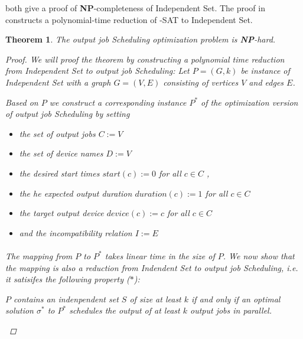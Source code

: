 \documentclass{article}
\newtheorem{mythm}{Theorem}
\begin{document}
\cite{GareyJohnson:CI:1979, 1994-papadimitriou} both give a proof of {\bf NP}-completeness of {\sc Independent Set}. The proof in \cite{1994-papadimitriou} constructs a polynomial-time reduction of {-SAT} to {\sc Independent Set}. %


\begin{mythm}
\label{thm:ic-scheduling-optimization-problem-is-NP-hard}
The {\sc output job Scheduling} optimization problem is {\bf NP}-hard.
\begin{proof}
We will proof the theorem by constructing a polynomial time reduction from {\sc Independent Set} to {\sc output job Scheduling}: 
Let $P = (G, k)$   be  instance of {\sc Independent Set} with a graph $G = (V,E)$ consisting of vertices $V$ and edges $E$. 

Based on $P$ we construct a corresponding instance $P^*$ of the optimization version of {\sc output job Scheduling} by setting 

\begin{itemize}
\item[-] the set of output jobs $C :=  V$ 
\item[-] the set of device names $D := V$
\item[-] the desired start times ${start}(c) := 0$ for all $c \in C$ ,
\item[-] the he expected output duration  ${duration}(c) := 1$ for all $c \in C$  
\item[-] the target output device ${device}(c) := c$ for all $c \in C$ 
\item[-] and the incompatibility relation $I := E$
\end{itemize}


\paragraph{}
The mapping from $P$ to $P^*$ takes linear time in the size of $P$. We now show that the mapping is also a reduction from {\sc Indendent Set} to {\sc output job Scheduling}, i.e.  it satisifes the following property  ($\ast$): 
\begin{center}
$P$ contains an indenpendent set $S$ of size at least $k$ if and only if an optimal solution $\sigma^*$ to $P^*$ schedules the output of at least $k$ output jobs in parallel. 
\end{center}


\end{proof}
\end{mythm}
\end{document}
